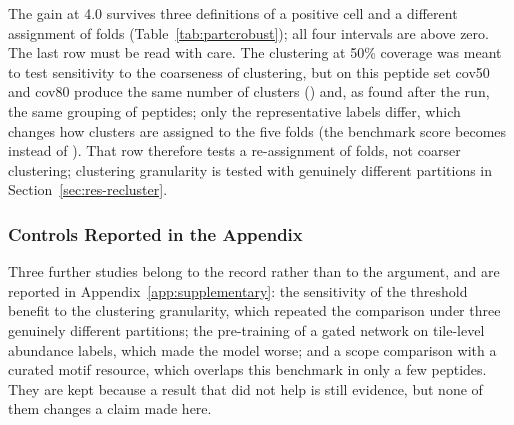 The gain at 4.0 survives three definitions of a positive cell and a different assignment of folds
(Table~\ref{tab:partcrobust}); all four intervals are above zero. The last row must be read with care. The clustering at
50\% coverage was meant to test sensitivity to the coarseness of clustering, but on this peptide set cov50 and
cov80 produce the same number of clusters (\nCClusters{}) and, as found after the run, the same grouping of peptides; only the
representative labels differ, which changes how clusters are assigned to the five folds (the benchmark score becomes \nCCoverFiftyBase{}
instead of \nAucRidge). That row therefore tests a re-assignment of folds, not coarser clustering; clustering granularity is tested
with genuinely different partitions in Section~\ref{sec:res-recluster}.

\subsubsection{Controls Reported in the Appendix}
Three further studies belong to the record rather than to the argument, and are reported in
Appendix~\ref{app:supplementary}: the sensitivity of the threshold benefit to the clustering
granularity, which repeated the comparison under three genuinely different partitions; the
pre-training of a gated network on tile-level abundance labels, which made the model worse; and a
scope comparison with a curated motif resource, which overlaps this benchmark in only a few
peptides. They are kept because a result that did not help is still evidence, but none of them
changes a claim made here.

